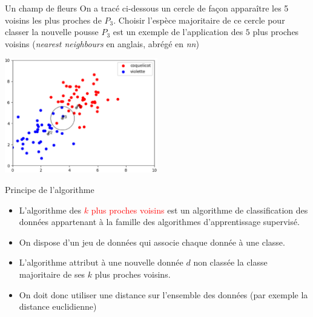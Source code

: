 \documentclass[10pt]{beamer}
\begin{document}
\begin{frame}{\Ctitle}{\stitle}
    \begin{exampleblock}{Un champ de fleurs}
        On a tracé ci-dessous un cercle de façon apparaître les 5 voisins les plus proches de $P_3$. Choisir l'espèce majoritaire de ce cercle pour classer la nouvelle pousse $P_3$ est un exemple de l'application des $5$ plus proches voisins (\textit{nearest neighbours} en anglais, abrégé en \textit{nn})
        \begin{center}
            \includegraphics[height=5cm]{ex_cours3.eps}
        \end{center}
    \end{exampleblock}
\end{frame}

\begin{frame}{\Ctitle}{\stitle}
	\begin{alertblock}{Principe de l'algorithme}
		\begin{itemize}
			\item<1-> L'algorithme des \textcolor{red}{$k$ plus proches voisins} est un algorithme de classification des données appartenant à la famille des algorithmes d'apprentissage supervisé.
			\item<2-> On dispose d'un jeu de données qui associe chaque donnée à une classe.
			\item<3-> L'algorithme attribut à une nouvelle donnée $d$ non classée la classe majoritaire de ses $k$ plus proches voisins.
			\item<4-> On doit donc utiliser une distance sur l'ensemble des données (par exemple la distance euclidienne)
		\end{itemize}
	\end{alertblock}
\end{frame}
\end{document}
